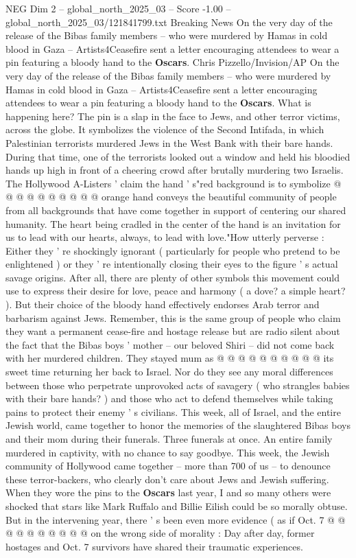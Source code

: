 \begin{textsample}{NEG Dim 2 – global\_north\_2025\_03 – Score -1.00 – global\_north\_2025\_03/121841799.txt}  \label{ex:f2_neg_024}
Breaking News On the very day of the release of the Bibas family members -- who were murdered by Hamas in cold blood in Gaza -- Artists4Ceasefire sent a letter encouraging attendees to wear a pin featuring a bloody hand to the \textbf{Oscars}.
Chris Pizzello/Invision/AP On the very day of the release of the Bibas family members -- who were murdered by Hamas in cold blood in Gaza -- Artists4Ceasefire sent a letter encouraging attendees to wear a pin featuring a bloody hand to the \textbf{Oscars}.
What is happening here?
The pin is a slap in the face to Jews, and other terror victims, across the globe.
It symbolizes the violence of the Second Intifada, in which Palestinian terrorists murdered Jews in the West Bank with their bare hands.
During that time, one of the terrorists looked out a window and held his bloodied hands up high in front of a cheering crowd after brutally murdering two Israelis.
The Hollywood A-Listers ' claim the hand ' s"red background is to symbolize @ @ @ @ @ @ @ @ @ @ orange hand conveys the beautiful community of people from all backgrounds that have come together in support of centering our shared humanity.
The heart being cradled in the center of the hand is an invitation for us to lead with our hearts, always, to lead with love."How utterly perverse : Either they ' re shockingly ignorant ( particularly for people who pretend to be enlightened ) or they ' re intentionally closing their eyes to the figure ' s actual savage origins.
After all, there are plenty of other symbols this movement could use to express their desire for love, peace and harmony ( a dove? a simple heart? ).
But their choice of the bloody hand effectively endorses Arab terror and barbarism against Jews.
Remember, this is the same group of people who claim they want a permanent cease-fire and hostage release but are radio silent about the fact that the Bibas boys ' mother -- our beloved Shiri -- did not come back with her murdered children.
They stayed mum as @ @ @ @ @ @ @ @ @ @ its sweet time returning her back to Israel.
Nor do they see any moral differences between those who perpetrate unprovoked acts of savagery ( who strangles babies with their bare hands? ) and those who act to defend themselves while taking pains to protect their enemy ' s civilians.
This week, all of Israel, and the entire Jewish world, came together to honor the memories of the slaughtered Bibas boys and their mom during their funerals.
Three funerals at once.
An entire family murdered in captivity, with no chance to say goodbye.
This week, the Jewish community of Hollywood came together -- more than 700 of us -- to denounce these terror-backers, who clearly don't care about Jews and Jewish suffering.
When they wore the pins to the \textbf{Oscars} last year, I and so many others were shocked that stars like Mark Ruffalo and Billie Eilish could be so morally obtuse.
But in the intervening year, there ' s been even more evidence ( as if Oct. 7 @ @ @ @ @ @ @ @ @ @ on the wrong side of morality : Day after day, former hostages and Oct. 7 survivors have shared their traumatic experiences.

\end{textsample}
